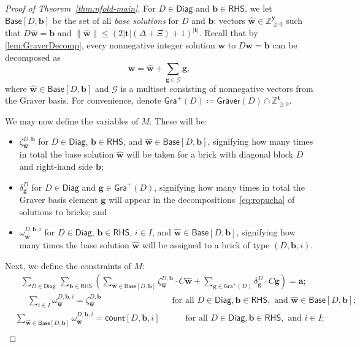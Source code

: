 \documentclass{article}
\renewcommand{\leq}{\leqslant}
\renewcommand{\geq}{\geqslant}
\newcommand{\Z}{\mathbb{Z}}
\newcommand{\Zn}{\Z_{\geq 0}}
\newcommand{\tup}[1]{{\mathbf{#1}}}
\newcommand{\ww}{\tup w}
\newcommand{\whww}{{\widehat{\ww}}}
\newcommand{\yy}{\tup y}
\newcommand{\tv}{\tup t}
\newcommand{\av}{\tup a}
\newcommand{\bb}{\tup b}
\renewcommand{\gg}{\tup g}
\newcommand{\Graver}{\mathsf{Graver}}
\newcommand{\Gg}{\mathcal{G}}
\newcommand{\RHS}{\mathsf{RHS}}
\newcommand{\Diag}{\mathsf{Diag}}
\newcommand{\Base}{\mathsf{Base}}
\newcommand{\Gra}{\mathsf{Gra}^+}
\newcommand{\cntTypes}{\mathsf{count}}
\begin{document}
\begin{proof}[Proof of Theorem~\ref{thm:nfold-main}]
For $D\in \Diag$ and $\bb\in \RHS$, we let $\Base[D,\bb]$ be the set of all {\em{base solutions}} for $D$ and $\bb$: vectors $\whww\in \Zn^\yy$ such that $D\whww=\bb$ and $\|\whww\|\leq (2|\tv|(\Delta+\Xi)+1)^{|\tv|}$. Recall that by \cref{lem:GraverDecomp}, every nonnegative integer solution $\ww$ to $D\ww=\bb$ can be decomposed as
\begin{equation}\label{eq:ropucha}
\ww = \whww+\sum_{\gg\in \Gg} \gg,
\end{equation}
where $\whww\in \Base[D,\bb]$ and $\Gg$ is a multiset consisting of nonnegative vectors from the Graver basis. For convenience, denote $\Gra(D)\coloneqq \Graver(D)\cap \Zn^\tv$.

We may now define the variables of $M$. These will be:
\begin{itemize}[nosep]
    \item $\zeta^{D,\bb}_\whww$ for $D\in \Diag$, $\bb\in \RHS$, and $\whww\in \Base[D,\bb]$, signifying how many times in total the base solution $\whww$ will be taken for a brick with diagonal block $D$ and right-hand side $\bb$;
    \item $\delta^D_\gg$ for $D\in \Diag$ and $\gg\in \Gra(D)$, signifying how many times in total the Graver basis element $\gg$ will appear in the decompositions~\cref{eq:ropucha} of solutions to bricks; and
    \item $\omega^{D,\bb,i}_{\whww}$ for $D\in \Diag$, $\bb\in \RHS$, $i\in I$, and $\whww\in \Base[D,\bb]$, signifying how many times the base solution $\whww$ will be assigned to a brick of type $(D,\bb,i)$.
\end{itemize}
Next, we define the constraints of $M$:
\begin{align*}
&\ \ \ \sum_{D\in \Diag}\,\sum_{\bb\in \RHS}\left( \sum_{\whww\in \Base{[D,\bb]}} \zeta^{D,\bb}_{\whww}\cdot C\whww + \sum_{\gg\in \Gra(D)} \delta^D_\gg\cdot C\gg \right)  = \av;
& \tag{C1} \label{IP:FindSolAss1} \\
&\quad\ \ \sum_{i\in I} \omega^{D,\bb,i}_{\whww} = \zeta^{D,\bb}_{\whww} \qquad\qquad\qquad\qquad\  \textrm{for all }D\in \Diag, \bb\in \RHS, \textrm{ and } \whww\in \Base[D,\bb]; & \tag{C2} \label{IP:FindSolAss3} \\
& \sum_{\whww\in \Base[D,\bb]} \omega^{D,\bb,i}_{\whww} = \cntTypes[D,\bb,i] \qquad\quad \textrm{for all }D\in \Diag, \bb\in \RHS, \textrm{ and } i\in I; & \tag{C3} \label{IP:FindSolAss4} \\

\end{align*}
\end{proof}
\end{document}
